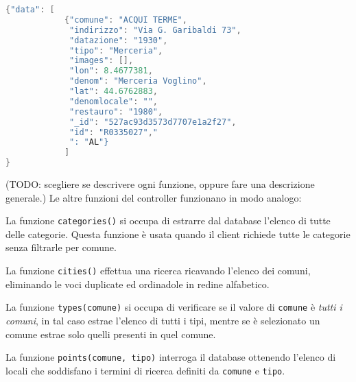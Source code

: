 \begin{minipage}{\linewidth}
\begin{lstlisting}[label=ls:detail,caption={Dati in formato JSON restituiti dal server.},language=c]
{"data": [
    		{"comune": "ACQUI TERME",
    	 	 "indirizzo": "Via G. Garibaldi 73",
    	 	 "datazione": "1930",
    	 	 "tipo": "Merceria",
    	 	 "images": [],
    	 	 "lon": 8.4677381,
    	 	 "denom": "Merceria Voglino",
    	 	 "lat": 44.6762883,
    	 	 "denomlocale": "",
    	 	 "restauro": "1980",
    	 	 "_id": "527ac93d3573d7707e1a2f27",
    	 	 "id": "R0335027","
    	 	 ": "AL"}
    	    ]
}
\end{lstlisting}
\end{minipage}

(TODO: scegliere se descrivere ogni funzione, oppure fare una descrizione generale.)
Le altre funzioni del controller funzionano in modo analogo:

La funzione \texttt{categories()} si occupa di estrarre dal database l'elenco di tutte delle categorie. Questa funzione è usata quando il client richiede tutte le categorie senza filtrarle per comune.

La funzione \texttt{cities()} effettua una ricerca ricavando l'elenco dei comuni, eliminando le voci duplicate ed ordinadole in redine alfabetico.

La funzione \texttt{types(comune)} si occupa di verificare se il valore di \texttt{comune} è \emph{tutti i comuni}, in tal caso estrae l'elenco di tutti i tipi, mentre se è selezionato un comune estrae solo quelli presenti in quel comune.

La funzione \texttt{points(comune, tipo)} interroga il database ottenendo l'elenco di locali che soddisfano i termini di ricerca definiti da \texttt{comune} e \texttt{tipo}.





